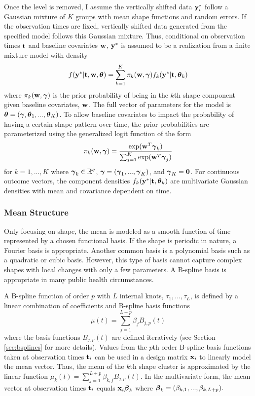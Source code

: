 Once the level is removed, I assume the vertically shifted data $\mathbf y_{i}^{*}$ follow a Gaussian mixture of $K$ groups with mean shape functions and random errors. If the observation times are fixed, vertically shifted data generated from the specified model follows this Gaussian mixture. Thus, conditional on observation times $\mathbf t$ and baseline covariates $\mathbf w$, $\mathbf y^{*}$ is assumed to be a realization from a finite mixture model with density
\begin{align*}
 f(\mathbf y^{*}|\mathbf t,\mathbf w,\boldsymbol\theta) =  \sum^{K}_{k=1}\pi_{k}(\mathbf w,\boldsymbol \gamma)f_{k}( \mathbf y^{*}|\mathbf t,\boldsymbol\theta_{k})
\end{align*}
where $\pi_{k}(\mathbf w,\boldsymbol \gamma)$ is the prior probability of being in the $k$th shape component given baseline covariates, $\mathbf w$. The full vector of parameters for the model is $\boldsymbol\theta = (\boldsymbol\gamma,\boldsymbol\theta_{1},...,\boldsymbol\theta_{K})$. To allow baseline covariates to impact the probability of having a certain shape pattern over time, the prior probabilities are parameterized using the generalized logit function of the form
$$\pi_{k}(\mathbf w,\boldsymbol\gamma)=\frac{\exp(\mathbf w^{T}\boldsymbol\gamma_{k})}{\sum_{j=1}^{K}\exp(\mathbf w^{T}\boldsymbol\gamma_{j})}$$ 
for $k=1,...,K$ where $\boldsymbol \gamma_{k}\in\mathbb{R}^{q}$, $\boldsymbol\gamma = (\boldsymbol\gamma_{1},...,\boldsymbol\gamma_{K})$, and $\boldsymbol\gamma_{K}=\mathbf 0$. For continuous outcome vectors, the component densities $f_{k}(\mathbf y^{*}|\mathbf t,\boldsymbol\theta_{k})$ are multivariate Gaussian densities with mean and covariance dependent  on time.

\subsubsection{Mean Structure}
Only focusing on shape, the mean is modeled as a smooth function of time represented by a chosen functional basis. If the shape is periodic in nature, a Fourier basis is appropriate. Another common basis is a polynomial basis such as a quadratic or cubic basis. However, this type of basis cannot capture complex shapes with local changes with only a few parameters. A B-spline basis is appropriate in many public health circumstances.

A B-spline function of order $p$ with $L$ internal knots, $\tau_{1},...,\tau_{L}$, is defined by a linear combination of coefficients and B-spline basis functions
$$\mu(t) = \sum^{L+p}_{j=1} \beta_j B_{j,p}(t)$$
where the basis functions $B_{j,p}(t)$ are defined iteratively \cite{deboor1972,cox1972}  (see Section \ref{sec:bsplines} for more details). Values from the $p$th order B-spline basis functions taken at observation times $\mathbf t_{i}$ can be used in a design matrix $\mathbf x_{i}$ to linearly model the mean vector. Thus, the mean of the $k$th shape cluster is approximated by the linear function $\mu_{k}(t) = \sum^{L+p}_{j=1} \beta_{k,j} B_{j,p}(t)$. In the multivariate form, the mean vector at observation times $\mathbf t_{i}$ equals $\mathbf x_{i}\boldsymbol\beta_{k}$ where $\boldsymbol\beta_{k}=(\beta_{k,1},...,\beta_{k, L+p}).$  

